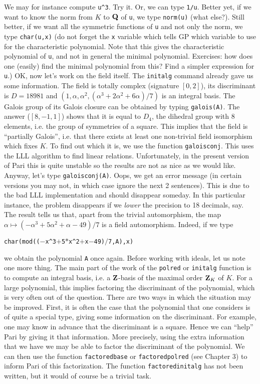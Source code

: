 We may for instance compute {\tt u\^{}3}. Try it. Or, we can type {\tt 1/u}.
Better yet, if we want to know the norm from $K$ to ${\bf Q}$ of {\tt u},
we type {\tt norm(u)} (what else?). Still better, if we want all the
symmetric functions of {\tt u} and not only the norm, we type
{\tt char(u,x)} (do not forget the {\tt x} variable which tells GP which
variable to use for the characteristic polynomial. Note that this gives
the characteristic polynomial of {\tt u}, and not in general the minimal
polynomial. Exercises: how does one (easily) find the minimal polynomial
from this? Find a simpler expression for {\tt u}.)
\smallskip
OK, now let's work on the field itself. The {\tt initalg} command already gave
us some information. The field is totally complex (signature $[0,2]$), its 
discriminant is $D=18981$ and 
$(1,\alpha,\alpha^2,(\alpha^3+2\alpha^2+6\alpha)/7)$ is an integral basis.
The Galois group of its Galois closure can be obtained by typing
{\tt galois(A)}. The answer ($[8,-1,1]$) shows that it is equal to $D_4$, the 
dihedral group with 8 elements, i.e. the group of symmetries of a square. 
\smallskip
This implies that the field is ``partially Galois'', i.e. that there exists at
least one non-trivial field isomorphism which fixes $K$. To find out which it
is, we use the function {\tt galoisconj}. This uses the LLL algorithm to find 
linear relations. Unfortunately, in the present version \vers{} of Pari this is
quite unstable so the results are not as nice as we would like. Anyway, let's
type {\tt galoisconj(A)}. Oops, we get an error message (in certain versions
you may not, in which case ignore the next 2 sentences). This is due to the 
bad LLL implementation and should disappear someday. In this particular 
instance, the problem disappears if we {\it lower}
the precision to 18 decimals, say. The result tells us that, apart from the
trivial automorphism, the map $\alpha\mapsto(-\alpha^3+5\alpha^2+\alpha-49)/7$
is a field automorphism. Indeed, if we type

\centerline{\tt char(mod(($-$x\^{}3$+$5$*$x\^{}2$+$x$-$49)$/$7,A),x)}

we obtain the polynomial {\tt A} once again.
\smallskip
Before working with ideals, let us note one more thing. The main part of the
work of the {\tt polred} or {\tt initalg} function is to compute an integral 
basis, i.e. a ${\bf Z}$-basis of the maximal order ${\bf Z}_K$ of $K$. For a large
polynomial, this implies factoring the discriminant of the polynomial, which
is very often out of the question. There are two ways in which the situation 
may be improved. First, it is often the case that the polynomial that one 
considers is of quite a special type, giving some information on the
discriminant. For example, one may know in advance that the discriminant is a
square. Hence we can ``help'' Pari by giving it that information. More
precisely, using the extra information that we have we may be able to factor
the discriminant of the polynomial. We can then use the function 
{\tt factoredbase} or {\tt factoredpolred} (see Chapter 3)
to inform Pari of this factorization. The function {\tt factoredinitalg} 
has not been written, but it would of course be a trivial task.

